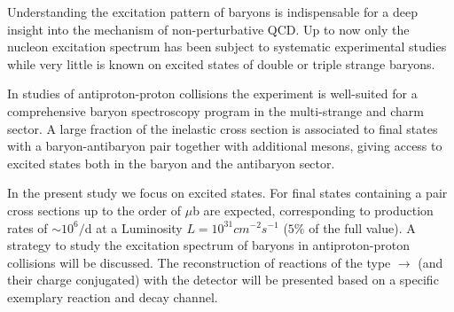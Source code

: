Understanding the excitation pattern of baryons is indispensable for a deep insight into the mechanism of non-perturbative QCD. 
Up to now only the nucleon excitation spectrum has been subject to systematic experimental studies while very little is known 
on excited states of double or triple strange baryons.

\noindent In studies of antiproton-proton collisions the \panda experiment is well-suited for a comprehensive baryon spectroscopy program
in the multi-strange and charm sector. 
A large fraction of the inelastic \pbarpSystem cross section is associated to final states with a baryon-antibaryon pair together with 
additional mesons, giving access to excited states both in the baryon and the antibaryon sector.

\noindent In the present study we focus on excited \cascade states. For final states containing a \cascade\anticascade pair cross sections 
up to the order of $\mu$b are expected, corresponding to production rates of $\sim 10^6/$d at a Luminosity $L=10^{31} \unit{cm}^{-2} \unit{s}^{-1}$
 ($5\%$ of the full value).
A strategy to study the excitation spectrum of \cascade baryons in antiproton-proton collisions will be discussed. The reconstruction of 
reactions of the type \pbarpSystem $\rightarrow$ \cascade* \anticascade (and their charge conjugated) with the \panda detector will be presented 
based on a specific exemplary reaction and decay channel.
